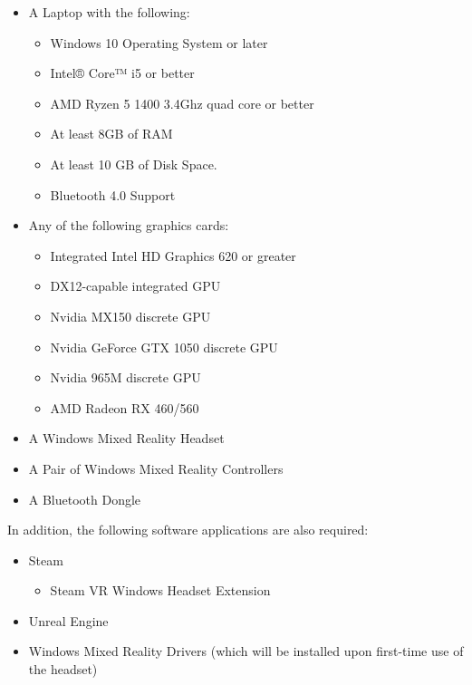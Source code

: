 \documentclass[onecolumn, draftclsnofoot,10pt, compsoc]{IEEEtran}
\begin{document}
\begin{itemize}
    \item A Laptop with the following:
        \begin{itemize}
            \item Windows 10 Operating System or later
            \item Intel® Core™ i5 or better
            \item AMD Ryzen 5 1400 3.4Ghz quad core or better
            \item At least 8GB of RAM
            \item At least 10 GB of Disk Space.
            \item Bluetooth 4.0 Support 
        \end{itemize}
    \item Any of the following graphics cards: 
        \begin{itemize}
            \item Integrated Intel HD Graphics 620 or greater 
            \item DX12-capable integrated GPU
            \item Nvidia MX150 discrete GPU
            \item Nvidia GeForce GTX 1050 discrete GPU
            \item Nvidia 965M discrete GPU
            \item AMD Radeon RX 460/560
        \end{itemize}
    \item A Windows Mixed Reality Headset
    \item A Pair of Windows Mixed Reality Controllers
    \item A Bluetooth Dongle
\end{itemize}


In addition, the following software applications are also required: 
\begin{itemize}
    \item Steam 
        \begin{itemize}
            \item Steam VR Windows Headset Extension
        \end{itemize}
    \item Unreal Engine %
    \item Windows Mixed Reality Drivers (which will be installed upon first-time use of the headset)
\end{itemize}
\end{document}
